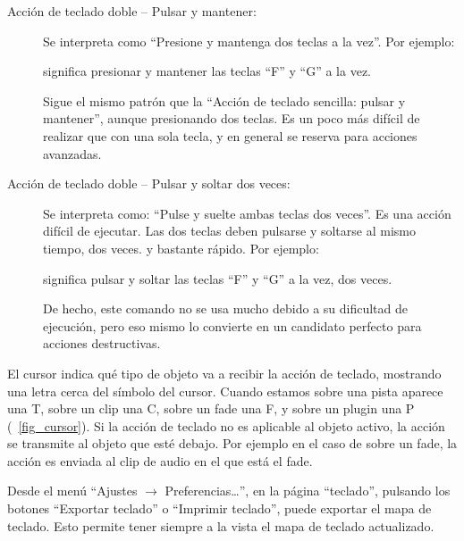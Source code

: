 \begin{description}
\item[Acción de teclado doble  -- Pulsar y mantener:]
Se interpreta como ``Presione y mantenga dos teclas a la vez''. Por ejemplo:
\begin{quotation}
\end{quotation}
significa presionar y mantener las teclas ``F'' y ``G'' a la vez.

Sigue el mismo patrón que la ``Acción de teclado sencilla: pulsar y mantener'', aunque presionando dos teclas. Es un poco más difícil de realizar que con una sola tecla, y en general se reserva para acciones avanzadas.

\item[Acción de teclado doble  -- Pulsar y soltar dos veces:]
Se interpreta como: ``Pulse y suelte ambas teclas dos veces''. Es una acción difícil de ejecutar. Las dos teclas deben pulsarse y soltarse al mismo tiempo, dos veces. y bastante rápido. Por ejemplo:
\begin{quotation}
\end{quotation}
significa pulsar y soltar las teclas ``F'' y ``G'' a la vez, dos veces.

De hecho, este comando no se usa mucho debido a su dificultad de ejecución, pero eso mismo lo convierte en un candidato perfecto para acciones destructivas.
\end{description}

El cursor indica qué tipo de objeto va a recibir la acción de teclado, mostrando una letra cerca del símbolo del cursor. Cuando estamos sobre una pista aparece una T, sobre un clip una C, sobre un fade una F, y sobre un plugin una P (\FigB~\ref{fig_cursor}). Si la acción de teclado no es aplicable al objeto activo, la acción se transmite al objeto que esté debajo. Por ejemplo en el caso de  sobre un fade, la acción es enviada al clip de audio en el que está el fade.

Desde el menú ``Ajustes $\rightarrow$ Preferencias\dots'', en la página ``teclado'', pulsando los botones ``Exportar teclado'' o ``Imprimir teclado'', puede exportar el mapa de teclado. Esto permite tener siempre a la vista el mapa de teclado actualizado.


